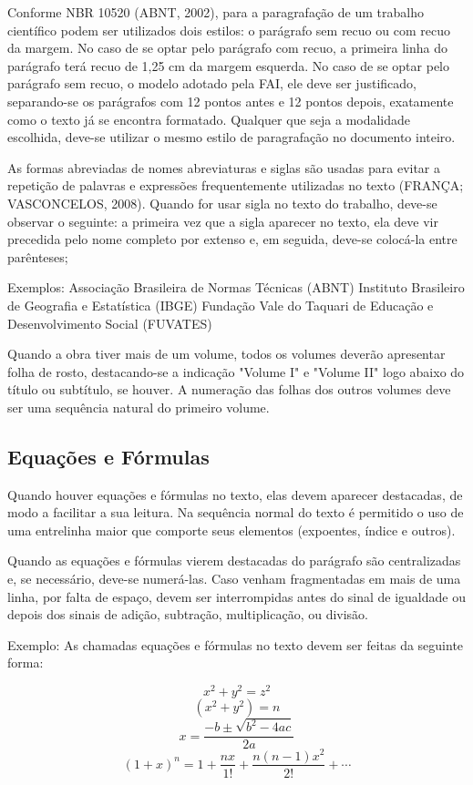 \documentclass[a4paper,12pt]{article}  %
\begin{document}
\begin{ElementosTextuais}
\begin{Desenvolvimento}
Conforme NBR 10520 (ABNT, 2002), para a paragrafação de um trabalho científico podem ser utilizados dois estilos: o parágrafo sem recuo ou com recuo da margem. No caso de se optar pelo parágrafo com recuo, a primeira linha do parágrafo terá recuo de 1,25 cm da margem esquerda. No caso de se optar pelo parágrafo sem recuo, o modelo adotado pela FAI, ele deve ser justificado, separando-se os parágrafos com 12 pontos antes e 12 pontos depois, exatamente como o texto já se encontra formatado. Qualquer que seja a modalidade escolhida, deve-se utilizar o mesmo estilo de paragrafação no documento inteiro.

As formas abreviadas de nomes abreviaturas e siglas são usadas para evitar a repetição de palavras e expressões frequentemente utilizadas no texto (FRANÇA; VASCONCELOS, 2008). Quando for usar sigla no texto do trabalho, deve-se observar o seguinte: a primeira vez que a sigla aparecer no texto, ela deve vir precedida pelo nome completo por extenso e, em seguida, deve-se colocá-la entre parênteses;

Exemplos: Associação Brasileira de Normas Técnicas (ABNT)
Instituto Brasileiro de Geografia e Estatística (IBGE)
Fundação Vale do Taquari de Educação e Desenvolvimento Social (FUVATES)

Quando a obra tiver mais de um volume, todos os volumes deverão apresentar folha de rosto, destacando-se a indicação "Volume I" e "Volume II" logo abaixo do título ou subtítulo, se houver. A numeração das folhas dos outros volumes deve ser uma sequência natural do primeiro volume.

\subsection{Equações e Fórmulas}
Quando houver equações e fórmulas no texto, elas devem aparecer destacadas, de modo a facilitar a sua leitura. Na sequência normal do texto é permitido o uso de uma entrelinha maior que comporte seus elementos (expoentes, índice e outros).

Quando as equações e fórmulas vierem destacadas do parágrafo são centralizadas e, se necessário, deve-se numerá-las. Caso venham fragmentadas em mais de uma linha, por falta de espaço, devem ser interrompidas antes do sinal de igualdade ou depois dos sinais de adição, subtração, multiplicação, ou divisão.

Exemplo: As chamadas equações e fórmulas no texto devem ser feitas da seguinte forma:

\begin{equation}
x^2 + y^2 = z^2 \label{eq:pythagoras}
\end{equation}
\begin{equation}
(x^2 + y^2) = n \label{eq:pythagoras2}
\end{equation}
\begin{equation}
x = \frac{-b \pm \sqrt{b^2-4ac}}{2a}
\end{equation}
\begin{equation}
(1 + x)^n = 1 + \frac{nx}{1!} + \frac{n(n-1)x^2}{2!} + \cdots
\end{equation}


\end{Desenvolvimento}
\end{ElementosTextuais}
\end{document}
